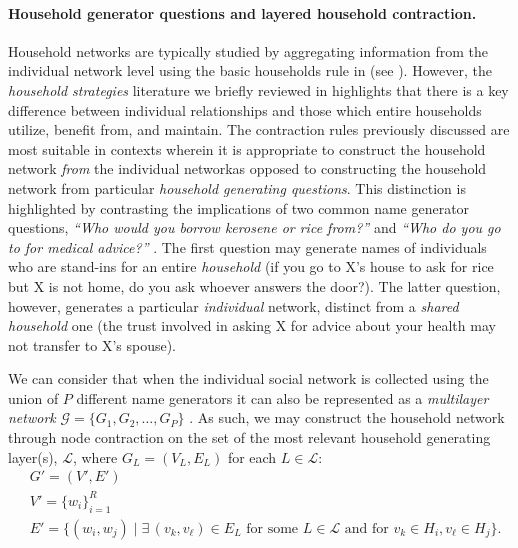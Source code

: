 \paragraph{Household generator questions and layered household contraction.} 
Household networks are typically studied by aggregating information from the individual network level using the basic households rule in  (see ). However, the \textit{household strategies} literature we briefly reviewed in  highlights that there is a key difference between individual relationships and those which entire households utilize, benefit from, and maintain. The contraction rules previously discussed are most suitable in contexts wherein it is appropriate to construct the household network \textit{from} the individual network\textemdash as opposed to constructing the household network from particular \textit{household generating questions}. This distinction is highlighted by contrasting the implications of two common name generator questions, \textit{``Who would you borrow kerosene or rice from?''} and \textit{``Who do you go to for medical advice?''} \citep[e.g.,][]{banerjee2013}. The first question may generate names of individuals who are stand-ins for an entire \textit{household} (if you go to X's house to ask for rice but X is not home, do you ask whoever answers the door?). The latter question, however, generates a particular \textit{individual} network, distinct from a \textit{shared household} one (the trust involved in asking X for advice about your health may not transfer to X's spouse).

We can consider that when the individual social network is collected using the union of $P$ different name generators it can also be represented as a \textit{multilayer network} $\mathcal{G} = \{G_1, G_2, \dots, G_P\}$ \citep[see, e.g.,][]{kivela2014multilayer}. As such, we may construct the household network through node contraction on the set of the most relevant household generating layer(s), $\mathcal{L}$, where
$G_L = (V_L, E_L)$ for each $L \in \mathcal{L}$:
\begin{equation*} \label{eq:layered_con}
    \begin{aligned}
    &G' = (V', E')\\
    &V' = \{ w_i \}_{i=1}^{R} \\
    &E' = \{ (w_i, w_j) \mid \exists \, (v_k, v_\ell) \in E_L \textrm{ for some }L \in \mathcal{L} \textrm{ and for } v_k \in H_i, v_\ell \in H_j  \}.
    \end{aligned}
\end{equation*}

